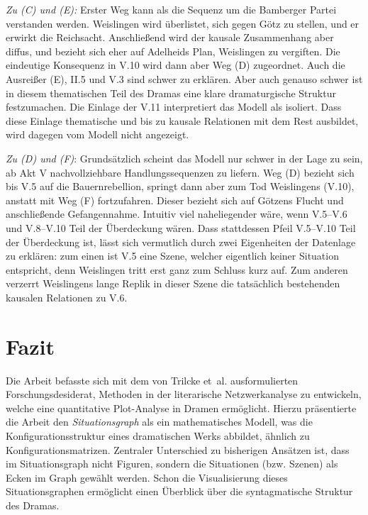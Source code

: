 \documentclass[a4paper,10pt,abstract=true,headings=small]{scrartcl}
\begin{document}
\emph{Zu (C) und (E):} Erster Weg kann als die Sequenz um die Bamberger Partei verstanden werden.
Weislingen wird überlistet, sich gegen Götz zu stellen, und er erwirkt die Reichsacht.
Anschließend wird der kausale Zusammenhang aber diffus, und bezieht sich eher auf Adelheids Plan, Weislingen zu vergiften.
Die eindeutige Konsequenz in V.10 wird dann aber Weg (D) zugeordnet.
Auch die Ausreißer (E), II.5 und V.3 sind schwer zu erklären.
Aber auch genauso schwer ist in diesem thematischen Teil des Dramas eine klare dramaturgische Struktur festzumachen.
Die Einlage der V.11  interpretiert das Modell als isoliert. %
Dass diese Einlage thematische und bis zu kausale Relationen mit dem Rest ausbildet, wird dagegen vom Modell nicht angezeigt.

\emph{Zu (D) und (F)}: Grundsätzlich scheint das Modell nur schwer in der Lage zu sein, ab Akt V nachvollziehbare Handlungssequenzen zu liefern.
Weg (D) bezieht sich bis V.5 auf die Bauernrebellion, springt dann aber zum Tod Weislingens (V.10), anstatt mit Weg (F) fortzufahren.
Dieser bezieht sich auf Götzens Flucht und anschließende Gefangennahme.
Intuitiv viel naheliegender wäre, wenn V.5–V.6 und V.8–V.10 Teil der Überdeckung wären.
Dass stattdessen Pfeil V.5–V.10 Teil der Überdeckung ist, lässt sich vermutlich durch zwei Eigenheiten der Datenlage zu erklären: zum einen ist V.5  eine Szene, welcher eigentlich keiner Situation entspricht, denn Weislingen tritt erst ganz zum Schluss kurz auf.
Zum anderen verzerrt Weislingens lange Replik in dieser Szene die tatsächlich bestehenden kausalen Relationen zu V.6.


\section{Fazit}

Die Arbeit befasste sich mit dem von Trilcke et~al. ausformulierten Forschungsdesiderat, Methoden in der literarische Netzwerkanalyse zu entwickeln, welche eine quantitative Plot-Analyse in Dramen ermöglicht.
Hierzu präsentierte die Arbeit den \emph{Situationsgraph} als ein mathematisches Modell, was die Konfigurationsstruktur eines dramatischen Werks abbildet, ähnlich zu Konfigurationsmatrizen.
Zentraler Unterschied zu bisherigen Ansätzen ist, dass im Situationsgraph nicht Figuren, sondern die Situationen (bzw. Szenen) als Ecken im Graph gewählt werden.
Schon die Visualisierung dieses Situationsgraphen ermöglicht einen Überblick über die syntagmatische Struktur des Dramas.
\end{document}
